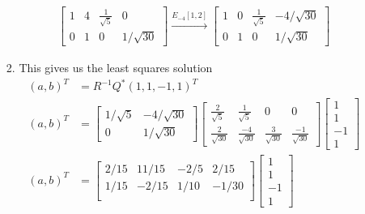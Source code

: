 \documentclass{uofa-eng-assignment}
\begin{document}
\begin{enumerate}
\begin{enumerate}
\begin{enumerate}
\begin{align*}
	      		      	\begin{bmatrix}
	      		      	1        & 4         & \frac{1}{\sqrt{5}} & 0            \\
	      		      	0        & 1         & 0                  & 1/\sqrt{30}  
	      		      	\end{bmatrix}  \xrightarrow{E_{-4}[1, 2]}             
	      		      	\begin{bmatrix}
	      		      	1        & 0         & \frac{1}{\sqrt{5}} & -4/\sqrt{30} \\
	      		      	0        & 1         & 0                  & 1/\sqrt{30}  
	      		      	\end{bmatrix}
	      		      \end{align*}
	      		\item This gives us the least squares solution
	      		      \begin{align*}
	      		      	(a, b)^T &= R^{-1}Q^*(1, 1, -1, 1)^T \\
	      		      	(a, b)^T &= \begin{bmatrix}
	      		      	1/\sqrt{5} &-4/\sqrt{30} \\
	      		      	0 & 1/\sqrt{30}
	      		      	\end{bmatrix}\begin{bmatrix}
	      		      	\frac{2}{\sqrt{5}}  & \frac{1}{\sqrt{5}}   & 0                   & 0                    \\
	      		      	\frac{2}{\sqrt{30}} & \frac{-4}{\sqrt{30}} & \frac{3}{\sqrt{30}} & \frac{-1}{\sqrt{30}} 
	      		      	\end{bmatrix}
	      		      	\begin{bmatrix}
	      		      	1 \\1 \\-1 \\1
	      		      	\end{bmatrix} \\
	      		      	(a, b)^T &= \begin{bmatrix}
	      		      	2/15                & 11/15                & -2/5                & 2/15                 \\
	      		      	1/15                & -2/15                & 1/10                & -1/30                \\
	      		      	\end{bmatrix}\begin{bmatrix}
	      		      	1 \\1 \\-1 \\1

\end{bmatrix}
\end{align*}
\end{enumerate}
\end{enumerate}
\end{enumerate}
\end{document}
